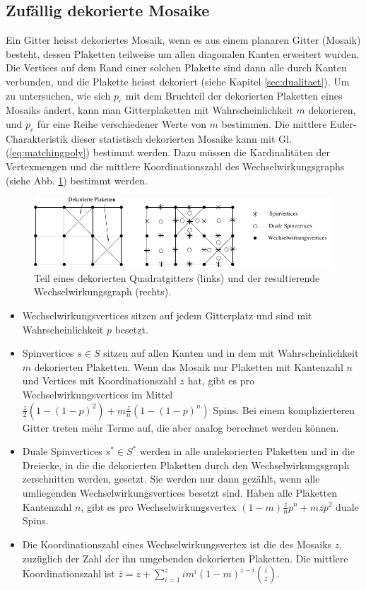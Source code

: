 \subsection{Zuf\"allig dekorierte Mosaike}
\label{sec:decorated}
Ein Gitter heisst dekoriertes Mosaik, wenn es aus einem planaren Gitter (Mosaik) besteht, dessen Plaketten teilweise um allen diagonalen Kanten erweitert wurden. Die Vertices auf dem Rand einer solchen Plakette sind dann alle durch Kanten verbunden, und die Plakette heisst dekoriert (siehe Kapitel \ref{sec:dualitaet}). Um zu untersuchen, wie sich $p_c$ mit dem Bruchteil der dekorierten Plaketten eines Mosaiks \"andert, kann man Gitterplaketten mit Wahrscheinlichkeit $m$ dekorieren, und $p_c$ f\"ur eine Reihe verschiedener Werte von $m$ bestimmen. Die mittlere Euler-Charakteristik dieser statistisch dekorierten Mosaike kann mit Gl. (\ref{eq:matchingpoly}) bestimmt werden. Dazu m\"ussen die Kardinalit\"aten der Vertexmengen und die mittlere Koordinationszahl des Wechselwirkungsgraphs (siehe Abb. \ref{fig:randomdec}) bestimmt werden. 
\begin{figure}[bp]
  \centering
  \includegraphics{./Schranken-figs/randomdec}
  \caption{Teil eines dekorierten Quadratgitters (links) und der resultierende Wechselwirkungsgraph (rechts).}
  \label{fig:randomdec}
\end{figure}
\begin{itemize}
\item Wechselwirkungsvertices sitzen auf jedem Gitterplatz und sind mit Wahrscheinlichkeit $p$ besetzt.
\item Spinvertices $s\in S$ sitzen auf allen Kanten und in dem mit Wahrscheinlichkeit $m$ dekorierten Plaketten. Wenn das Mosaik nur Plaketten mit Kantenzahl $n$ und Vertices mit Koordinationszahl $z$ hat, gibt es pro Wechselwirkungsvertices im Mittel $\frac{z}{2}(1-(1-p)^2)+m\frac{z}{n}(1-(1-p)^n)$ Spins. Bei einem komplizierteren Gitter treten mehr Terme auf, die aber analog berechnet werden k\"onnen.
\item Duale Spinvertices $s^*\in S^*$ werden in alle undekorierten Plaketten und in die Dreiecke, in die die dekorierten Plaketten durch den Wechselwirkungsgraph zerschnitten werden, gesetzt. Sie werden nur dann gez\"ahlt, wenn alle umliegenden Wechselwirkungsvertices besetzt sind. Haben alle Plaketten Kantenzahl $n$, gibt es pro Wechselwirkungsvertex $(1-m)\frac{z}{n}p^n+mzp^2$ duale Spins.
\item Die Koordinationszahl eines Wechselwirkungsvertex ist die des Mosaiks $z$, zuz\"uglich der Zahl der ihn umgebenden dekorierten Plaketten. Die mittlere Koordinationszahl ist $\bar{z}=z+\sum_{i=1}^z im^i(1-m)^{z-i}{ i \choose z }$.
\end{itemize}    
